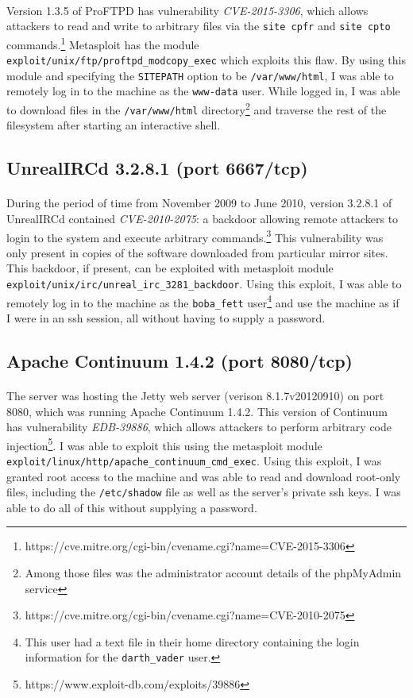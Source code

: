 \documentclass{article}
\begin{document}
\paragraph{}
Version 1.3.5 of ProFTPD has vulnerability \emph{CVE-2015-3306}, which allows attackers to read and write to arbitrary files via the \texttt{site cpfr} and \texttt{site cpto} commands.\footnote{https://cve.mitre.org/cgi-bin/cvename.cgi?name=CVE-2015-3306}
Metasploit has the module \texttt{exploit/unix/ftp/proftpd\_modcopy\_exec} which exploits this flaw.
By using this module and specifying the \texttt{SITEPATH} option to be \texttt{/var/www/html}, I was able to remotely log in to the machine as the \texttt{www-data} user.
While logged in, I was able to download files in the \texttt{/var/www/html} directory\footnote{Among those files was the administrator account details of the phpMyAdmin service} and traverse the rest of the filesystem after starting an interactive shell.

\subsection{UnrealIRCd 3.2.8.1 (port 6667/tcp)}
\paragraph{}
During the period of time from November 2009 to June 2010, version 3.2.8.1 of UnrealIRCd contained \emph{CVE-2010-2075}: a backdoor allowing remote attackers to login to the system and execute arbitrary commands.\footnote{https://cve.mitre.org/cgi-bin/cvename.cgi?name=CVE-2010-2075}
This vulnerability was only present in copies of the software downloaded from particular mirror sites.
This backdoor, if present, can be exploited with metasploit module \texttt{exploit/unix/irc/unreal\_irc\_3281\_backdoor}.
Using this exploit, I was able to remotely log in to the machine as the \texttt{boba\_fett} user\footnote{This user had a text file in their home directory containing the login information for the \texttt{darth\_vader} user.} and use the machine as if I were in an ssh session, all without having to supply a password.

\subsection{Apache Continuum 1.4.2 (port 8080/tcp)}
\paragraph{}
The server was hosting the Jetty web server (verison 8.1.7v20120910) on port 8080, which was running Apache Continuum 1.4.2.
This version of Continuum has vulnerability \emph{EDB-39886}, which allows attackers to perform arbitrary code injection\footnote{https://www.exploit-db.com/exploits/39886}.
I was able to exploit this using the metasploit module \texttt{exploit/linux/http/apache\_continuum\_cmd\_exec}.
Using this exploit, I was granted root access to the machine and was able to read and download root-only files, including the \texttt{/etc/shadow} file as well as the server's private ssh keys.
I was able to do all of this without supplying a password.
\end{document}
